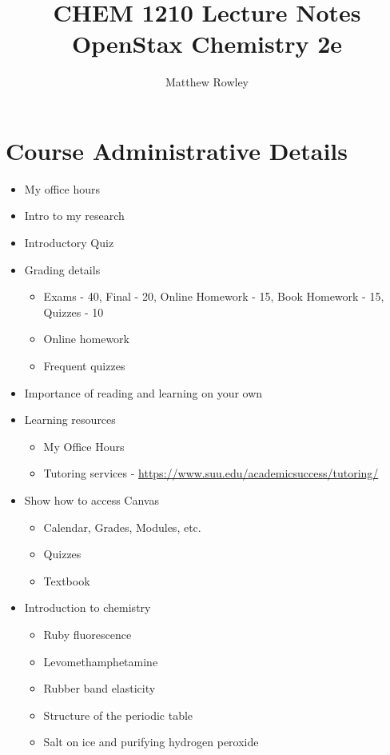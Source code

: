 \documentclass[12pt, openany, letterpaper]{memoir}
\begin{document}
\title{CHEM 1210 Lecture Notes\\ OpenStax Chemistry 2e}
\author{Matthew Rowley}
\mainmatter
\maketitle
\chapter*{Course Administrative Details}
\begin{itemize}
	\item My office hours
	\item Intro to my research
	\item Introductory Quiz
	\item Grading details
	      \begin{itemize}
		      \item Exams - 40, Final - 20, Online Homework - 15, Book Homework - 15, Quizzes - 10
		      \item Online homework
		      \item Frequent quizzes
	      \end{itemize}
	\item Importance of reading and learning on your own
	\item Learning resources
	      \begin{itemize}
		      \item My Office Hours
		      \item Tutoring services - \href{https://www.suu.edu/academicsuccess/tutoring/}{https://www.suu.edu/academicsuccess/tutoring/}
	      \end{itemize}
	\item Show how to access Canvas
	      \begin{itemize}
		      \item Calendar, Grades, Modules, etc.
		      \item Quizzes
		      \item Textbook
	      \end{itemize}
	\item Introduction to chemistry
	      \begin{itemize}
		      \item Ruby fluorescence
		      \item Levomethamphetamine
		      \item Rubber band elasticity
		      \item Structure of the periodic table
		      \item Salt on ice and purifying hydrogen peroxide
	      \end{itemize}
\end{itemize}
\end{document}
